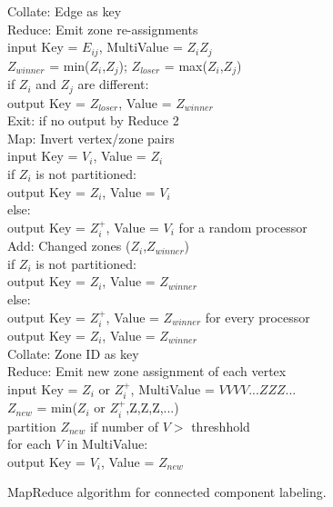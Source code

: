 \begin{figure}[htb]
\begin{center}
{\begin{minipage}{\textwidth}
\begin{tabbing}
 Collate: \> Edge as key \\
 Reduce: \> Emit zone re-assignments \\
       \> \> \> input Key = $E_{ij}$, MultiValue = $Z_i Z_j$ \\
       \> \> \> $Z_{winner}$ = min($Z_i$,$Z_j$); $Z_{loser}$ = max($Z_i$,$Z_j$) \\
       \> \> \> if $Z_i$ and $Z_j$ are different: \\
      \> \> \> \> output Key = $Z_{loser}$, Value = $Z_{winner}$ \\
 Exit: \> if no output by Reduce 2 \\
 Map: \> Invert vertex/zone pairs \\
    \> \> \> input Key = $V_i$, Value = $Z_i$ \\
    \> \> \> if $Z_i$ is not partitioned: \\
   \> \> \> \> output Key = $Z_i$, Value = $V_i$ \\
    \> \> \> else: \\
   \> \> \> \> output Key = $Z_i^+$, Value = $V_i$ for a random processor \\
 Add: \> Changed zones ($Z_i$,$Z_{winner}$) \\
    \> \> \> if $Z_i$ is not partitioned: \\
   \> \> \> \> output Key = $Z_i$, Value = $Z_{winner}$ \\
    \> \> \> else: \\
   \> \> \> \> output Key = $Z_i^+$, Value = $Z_{winner}$ for every processor \\
   \> \> \> \> output Key = $Z_i$, Value = $Z_{winner}$ \\
 Collate: \> Zone ID as key \\
 Reduce: \> Emit new zone assignment of each vertex \\
       \> \> \> input Key = $Z_i$ or $Z_i^+$, MultiValue = $V V V V ... Z Z Z ...$ \\
       \> \> \> $Z_{new}$ = min($Z_i$ or $Z_i^+$,Z,Z,Z,...) \\
       \> \> \> partition $Z_{new}$ if number of $V >$ threshhold \\
       \> \> \> for each $V$ in MultiValue: \\
      \> \> \> \> output Key = $V_i$, Value = $Z_{new}$

  \end{tabbing}
 \end{minipage}}\end{center}

 \caption{MapReduce algorithm for connected component labeling.}

 \label{fig:cc}
\end{figure}

